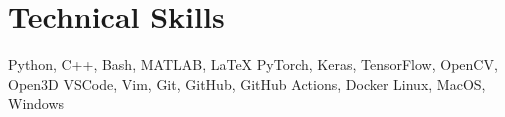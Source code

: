 \section{Technical Skills}

\setlength{\multicolsep}{-4pt}
\begin{multicols}{2}
\raggedcolumns

\resumeSubHeadingListStart
    {Python, C++, Bash, MATLAB, \LaTeX}
    {PyTorch, Keras, TensorFlow, OpenCV, Open3D}
    {VSCode, Vim, Git, GitHub, GitHub Actions, Docker}
    {Linux, MacOS, Windows}
\resumeSubHeadingListEnd

\end{multicols}

